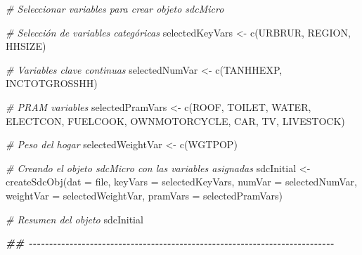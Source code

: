 \documentclass[
]{book}
\newenvironment{Shaded}{\begin{snugshade}}{\end{snugshade}}
\newcommand{\AttributeTok}[1]{\textcolor[rgb]{0.77,0.63,0.00}{#1}}
\newcommand{\CommentTok}[1]{\textcolor[rgb]{0.56,0.35,0.01}{\textit{#1}}}
\newcommand{\DocumentationTok}[1]{\textcolor[rgb]{0.56,0.35,0.01}{\textbf{\textit{#1}}}}
\newcommand{\FunctionTok}[1]{\textcolor[rgb]{0.00,0.00,0.00}{#1}}
\newcommand{\NormalTok}[1]{#1}
\newcommand{\OtherTok}[1]{\textcolor[rgb]{0.56,0.35,0.01}{#1}}
\newcommand{\StringTok}[1]{\textcolor[rgb]{0.31,0.60,0.02}{#1}}
\theoremstyle{definition}
\theoremstyle{definition}
\theoremstyle{definition}
\theoremstyle{definition}
\theoremstyle{remark}
\begin{document}
\begin{Shaded}
\begin{Highlighting}[]
\CommentTok{\# Seleccionar variables para crear objeto sdcMicro}

\CommentTok{\# Selección de variables categóricas}
\NormalTok{selectedKeyVars }\OtherTok{\textless{}{-}} \FunctionTok{c}\NormalTok{(}\StringTok{\textquotesingle{}URBRUR\textquotesingle{}}\NormalTok{, }\StringTok{\textquotesingle{}REGION\textquotesingle{}}\NormalTok{, }\StringTok{\textquotesingle{}HHSIZE\textquotesingle{}}\NormalTok{)}

\CommentTok{\# Variables clave continuas}
\NormalTok{selectedNumVar }\OtherTok{\textless{}{-}} \FunctionTok{c}\NormalTok{(}\StringTok{\textquotesingle{}TANHHEXP\textquotesingle{}}\NormalTok{, }\StringTok{\textquotesingle{}INCTOTGROSSHH\textquotesingle{}}\NormalTok{)}

\CommentTok{\# PRAM variables}
\NormalTok{selectedPramVars }\OtherTok{\textless{}{-}} \FunctionTok{c}\NormalTok{(}\StringTok{\textquotesingle{}ROOF\textquotesingle{}}\NormalTok{, }\StringTok{\textquotesingle{}TOILET\textquotesingle{}}\NormalTok{, }\StringTok{\textquotesingle{}WATER\textquotesingle{}}\NormalTok{, }\StringTok{\textquotesingle{}ELECTCON\textquotesingle{}}\NormalTok{,}
                \StringTok{\textquotesingle{}FUELCOOK\textquotesingle{}}\NormalTok{, }\StringTok{\textquotesingle{}OWNMOTORCYCLE\textquotesingle{}}\NormalTok{, }\StringTok{\textquotesingle{}CAR\textquotesingle{}}\NormalTok{, }\StringTok{\textquotesingle{}TV\textquotesingle{}}\NormalTok{, }\StringTok{\textquotesingle{}LIVESTOCK\textquotesingle{}}\NormalTok{)}

\CommentTok{\# Peso del hogar}
\NormalTok{selectedWeightVar }\OtherTok{\textless{}{-}} \FunctionTok{c}\NormalTok{(}\StringTok{\textquotesingle{}WGTPOP\textquotesingle{}}\NormalTok{)}


\CommentTok{\# Creando el objeto sdcMicro con las variables asignadas}
\NormalTok{sdcInitial }\OtherTok{\textless{}{-}} \FunctionTok{createSdcObj}\NormalTok{(}\AttributeTok{dat          =}\NormalTok{ file,}
                           \AttributeTok{keyVars      =}\NormalTok{ selectedKeyVars,}
                           \AttributeTok{numVar       =}\NormalTok{ selectedNumVar,}
                           \AttributeTok{weightVar    =}\NormalTok{ selectedWeightVar,}
                           \AttributeTok{pramVars     =}\NormalTok{ selectedPramVars)}

\CommentTok{\# Resumen del objeto}
\NormalTok{sdcInitial}

\DocumentationTok{\#\# {-}{-}{-}{-}{-}{-}{-}{-}{-}{-}{-}{-}{-}{-}{-}{-}{-}{-}{-}{-}{-}{-}{-}{-}{-}{-}{-}{-}{-}{-}{-}{-}{-}{-}{-}{-}{-}{-}{-}{-}{-}{-}{-}{-}{-}{-}{-}{-}{-}{-}{-}{-}{-}{-}{-}{-}{-}{-}{-}{-}{-}{-}{-}{-}{-}{-}{-}{-}{-}{-}{-}{-}{-}{-}{-}}
\end{Highlighting}
\end{Shaded}
\end{document}
